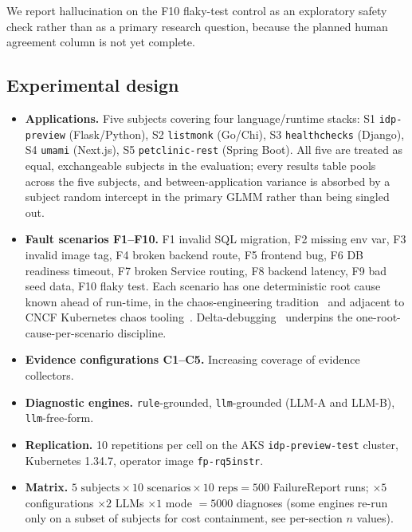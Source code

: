\documentclass[sigconf, nonacm=true, anonymous=false, review=false]{acmart}
\newcommand{\fp}{FailureReport\xspace}
\newcommand{\Cn}[1]{C#1\xspace}
\newcommand{\fn}[1]{F#1\xspace}
\begin{document}
We report hallucination on the \fn{10} flaky-test control as an
exploratory safety check rather than as a primary research question,
because the planned human agreement column is not yet complete.

\subsection{Experimental design}
\label{sec:eval-design}

\begin{itemize}
  \item \textbf{Applications.} Five subjects covering four
    language/runtime stacks: S1 \texttt{idp-preview} (Flask/Python),
    S2 \texttt{listmonk} (Go/Chi), S3 \texttt{healthchecks} (Django),
    S4 \texttt{umami} (Next.js), S5 \texttt{petclinic-rest} (Spring
    Boot). All five are treated as equal, exchangeable subjects in the
    evaluation; every results table pools across the five subjects, and
    between-application variance is absorbed by a subject random
    intercept in the primary GLMM rather than being singled out.
  \item \textbf{Fault scenarios \fn{1}--\fn{10}.} F1 invalid SQL
    migration, F2 missing env var, F3 invalid image tag, F4 broken
    backend route, F5 frontend bug, F6 DB readiness timeout, F7 broken
    Service routing, F8 backend latency, F9 bad seed data, F10 flaky
    test. Each scenario has one deterministic root cause known
    ahead of run-time, in the chaos-engineering
    tradition~\cite{basiri_chaos_2016} and adjacent to CNCF
    Kubernetes chaos tooling~\cite{litmus_chaos_cncf,
    chaos_mesh_cncf}. Delta-debugging~\cite{zeller_delta_2002}
    underpins the one-root-cause-per-scenario discipline.
  \item \textbf{Evidence configurations \Cn{1}--\Cn{5}.} Increasing
    coverage of evidence collectors.
  \item \textbf{Diagnostic engines.} \texttt{rule}-grounded,
    \texttt{llm}-grounded (LLM-A and LLM-B), \texttt{llm}-free-form.
  \item \textbf{Replication.} 10 repetitions per cell on the AKS
    \texttt{idp-preview-test} cluster, Kubernetes 1.34.7, operator
    image \texttt{fp-rq5instr}.
  \item \textbf{Matrix.} $5 \text{ subjects} \times 10 \text{ scenarios}
    \times 10 \text{ reps} = 500$ \fp{} runs; $\times 5$ configurations
    $\times 2$ LLMs $\times 1$ mode $= 5000$ diagnoses (some engines
    re-run only on a subset of subjects for cost containment, see
    per-section $n$ values).
\end{itemize}
\end{document}
